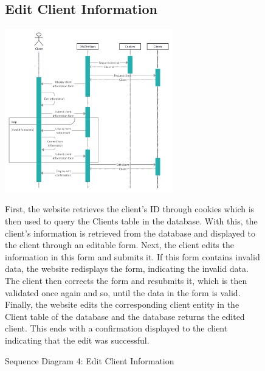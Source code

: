 \documentclass[11pt]{article}
\newcounter{use case ID}
\begin{document}
\begin{figure}[ht!]
    \subsection{Edit Client Information}
    \centering
    \includegraphics[width=0.65\textwidth,height=0.3\paperheight]{Diagrams/Sequence/Edit_Client_Info.jpg} 
    \caption{Sequence Diagram 4: Edit Client Information}
    \label{fig: Edit Client Information}
    \begin{flushleft}
        First, the website retrieves the client’s ID through cookies which is then used to query the Clients table in the database. With this, the client’s information is retrieved from the database and displayed to the client through an editable form. Next, the client edits the information in this form and submits it. If this form contains invalid data, the website redisplays the form, indicating the invalid data. The client then corrects the form and resubmits it, which is then validated once again and so, until the data in the form is valid. Finally, the website edits the corresponding client entity in the Client table of the database and the database returns the edited client. This ends with a confirmation displayed to the client indicating that the edit was successful.
    \end{flushleft}
\end{figure}
\end{document}
